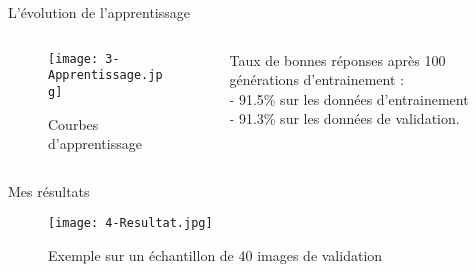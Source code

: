 \begin{frame}{L'évolution de l'apprentissage}
	\begin{columns}[T] %
		\begin{column}{.58\textwidth}
			\begin{figure}
				\centering
				\texttt{[image: 3-Apprentissage.jpg]}
				\caption{Courbes d'apprentissage}
			\end{figure}
		\end{column}
		\hfill
		\begin{column}{.54\textwidth}
			\bigskip	\bigskip	\bigskip
			\bigskip	\bigskip	\bigskip
			\bigskip	\bigskip	\bigskip
			Taux de bonnes réponses après 100 générations d'entrainement : \\
			- 91.5\% sur les données d'entrainement \\
			- 91.3\% sur les données de validation. \\
		\end{column}%
	\end{columns}
\end{frame}


\begin{frame}{Mes résultats}
	\begin{figure}
		\centering
		\texttt{[image: 4-Resultat.jpg]}
		\caption{Exemple sur un échantillon de 40 images de validation}
	\end{figure}
\end{frame}

